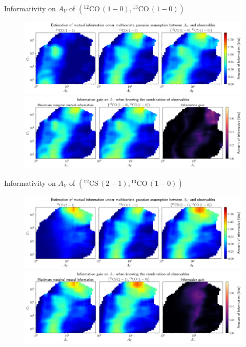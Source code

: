 \documentclass{beamer}
\begin{document}
\begin{frame}{Informativity on $A_V$ of $\left(\mathrm{^{12}CO\,(1-0)},\mathrm{^{13}CO\,(1-0)}\right)$}
    \begin{figure}
        \centering
        \includegraphics[width=0.95\linewidth]{../linearinfo/av__12co10_13co10_linearinfo.png}
        \vfill
        \includegraphics[width=0.95\linewidth]{../linearinfo/av__12co10_13co10_linearinfo_gain.png}
    \end{figure}
\end{frame}

\begin{frame}{Informativity on $A_V$ of $\left(\mathrm{^{12}CS\,(2-1)},\mathrm{^{13}CO\,(1-0)}\right)$}
    \begin{figure}
        \centering
        \includegraphics[width=0.95\linewidth]{../linearinfo/av__12cs21_13co10_linearinfo.png}
        \vfill
        \includegraphics[width=0.95\linewidth]{../linearinfo/av__12cs21_13co10_linearinfo_gain.png}
    \end{figure}
\end{frame}
\end{document}
